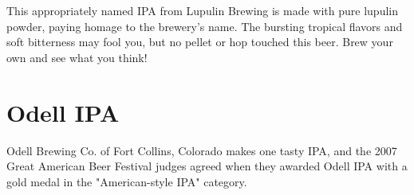 \documentclass[10pt,oneside]{scrbook}
\begin{document}
\begin{aboutblock}
This appropriately named IPA from Lupulin Brewing is made with pure lupulin powder,
paying homage to the brewery's name. The bursting tropical flavors and soft bitterness
may fool you, but no pellet or hop touched this beer. Brew your own and see what you think!
\end{aboutblock}


\begin{methodandtiming}
 
\begin{mashsteps}
\end{mashsteps}

\begin{fermentationsteps}
\end{fermentationsteps}

\end{methodandtiming}

\pagebreak

\begin{ingredientsblock}

\begin{malts}
\end{malts}

\begin{hops}
\end{hops}

\begin{yeasts}
\end{yeasts}

\end{ingredientsblock}

\chapter*{Odell IPA}

\begin{aboutblock}
Odell Brewing Co. of Fort Collins, Colorado makes one tasty IPA, and the 2007 Great American
Beer Festival judges agreed when they awarded Odell IPA with a gold medal in the
"American-style IPA" category.
\end{aboutblock}
\end{document}
